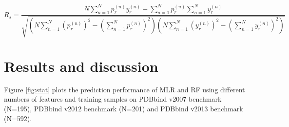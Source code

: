 \documentclass[journal=jacsat,manuscript=article]{achemso}
\begin{document}
\begin{equation}
R_s = \frac{N\sum_{n=1}^Np_r^{(n)}y_r^{(n)}-\sum_{n=1}^Np_r^{(n)}\sum_{n=1}^Ny_r^{(n)}}{\sqrt{(N\sum_{n=1}^N(p_r^{(n)})^2-(\sum_{n=1}^Np_r^{(n)})^2)(N\sum_{n=1}^N(y_r^{(n)})^2-(\sum_{n=1}^Ny_r^{(n)})^2)}}
\label{eqn:scor}
\end{equation}

\section{Results and discussion}

Figure \ref{fig:stat} plots the prediction performance of MLR and RF using different numbers of features and training samples on PDBbind v2007 benchmark (N=195), PDBbind v2012 benchmark (N=201) and PDBbind v2013 benchmark (N=592).
\end{document}

